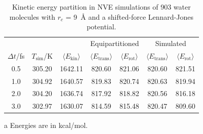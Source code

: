 \documentclass[aip,jcp,reprint,amsmath,amssymb]{revtex4-1}
\begin{document}
\begin{table}
	\begin{threeparttable}
		\caption{Kinetic energy partition in NVE simulations of 903 water molecules with $r_c$ = 9~{\r A} and a shifted-force Lennard-Jones potential.} %
		\label{table:water_partition_LJ-SF}
		\begin{ruledtabular}
			\begin{tabular}{ccccccc}
				& & & \multicolumn{2}{c}{Equipartitioned} & \multicolumn{2}{c}{Simulated}\\
				\cline{4-7}
				$\Delta t$/fs & $T_\text{sim}$/K & $\langle E_\text{kin}\rangle$ & $\langle E_\text{trans}\rangle$ & $\langle E_\text{rot}\rangle$ & $\langle E_\text{trans}\rangle$ & $\langle E_\text{rot}\rangle$ \\
				\hline
				0.5 & 305.20  & 1642.11  & 820.60  & 821.06  & 820.60 & 821.51  \\
				1.0 & 304.92  & 1640.57  & 819.83  & 820.74  & 820.63 & 819.94  \\
				2.0 & 304.20  & 1636.74  & 817.92  & 818.82  & 820.56 & 816.18  \\
				3.0 & 302.97  & 1630.07  & 814.59  & 815.48  & 820.47 & 809.60
			\end{tabular}
		\end{ruledtabular}
		\begin{tablenotes}
			\item[a] Energies are in kcal/mol.
		\end{tablenotes}
	\end{threeparttable}
\end{table}
\end{document}
